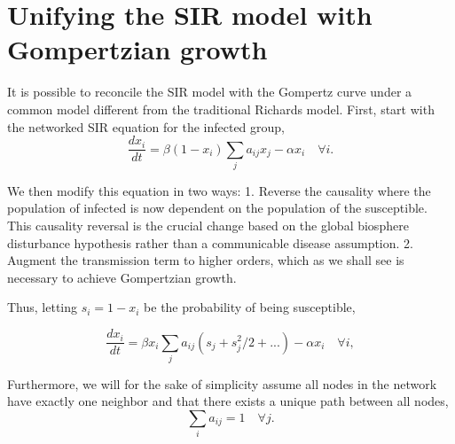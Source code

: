 \documentclass{article}
\begin{document}
\section*{Unifying the SIR model with Gompertzian growth}
It is possible to reconcile the SIR model with the Gompertz curve under a common model different from the traditional Richards model. First, start with the networked SIR equation for the infected group,
\begin{equation}
\label{eq:SIRnetwork}
\frac{d x_i}{dt} = \beta (1-x_i)\sum_j{a_{ij}}x_j - \alpha x_i\quad \forall i.
\end{equation}

We then modify this equation in two ways: 1. Reverse the causality where the population of infected is now dependent on the population of the susceptible. This causality reversal is the crucial change based on the global biosphere disturbance hypothesis rather than a communicable disease assumption. 2. Augment the transmission term to higher orders, which as we shall see is necessary to achieve Gompertzian growth.

Thus, letting $s_i = 1 - x_i$ be the probability of being susceptible,

\begin{equation}
\label{eq:modSIR}
\frac{d x_i}{dt} = \beta x_i\sum_j{a_{ij}}(s_{j} + s^2_j/2 + ...) - \alpha x_i\quad \forall i,
\end{equation}

Furthermore, we will for the sake of simplicity assume all nodes in the network have exactly one neighbor and that there exists a unique path between all nodes,
\begin{equation}
\sum_i a_{ij} = 1 \quad \forall j.
\end{equation} 
\end{document}
